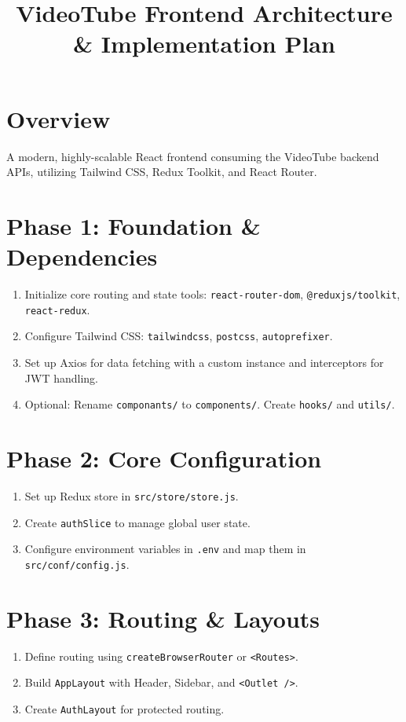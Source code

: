\documentclass[a4paper,12pt]{article}
\title{\textbf{VideoTube Frontend Architecture & Implementation Plan}}
\author{}
\date{}
\begin{document}
\maketitle

\section*{Overview}
A modern, highly-scalable React frontend consuming the VideoTube backend APIs, utilizing Tailwind CSS, Redux Toolkit, and React Router.

\section*{Phase 1: Foundation & Dependencies}
\begin{enumerate}[label=\arabic*.]
\item Initialize core routing and state tools: \texttt{react-router-dom}, \texttt{@reduxjs/toolkit}, \texttt{react-redux}.
\item Configure Tailwind CSS: \texttt{tailwindcss}, \texttt{postcss}, \texttt{autoprefixer}.
\item Set up Axios for data fetching with a custom instance and interceptors for JWT handling.
\item Optional: Rename \texttt{componants/} to \texttt{components/}. Create \texttt{hooks/} and \texttt{utils/}.
\end{enumerate}

\section*{Phase 2: Core Configuration}
\begin{enumerate}[label=\arabic*.]
\item Set up Redux store in \texttt{src/store/store.js}.
\item Create \texttt{authSlice} to manage global user state.
\item Configure environment variables in \texttt{.env} and map them in \texttt{src/conf/config.js}.
\end{enumerate}

\section*{Phase 3: Routing & Layouts}
\begin{enumerate}[label=\arabic*.]
\item Define routing using \texttt{createBrowserRouter} or \texttt{<Routes>}.
\item Build \texttt{AppLayout} with Header, Sidebar, and \texttt{<Outlet />}.
\item Create \texttt{AuthLayout} for protected routing.
\end{enumerate}
\end{document}
